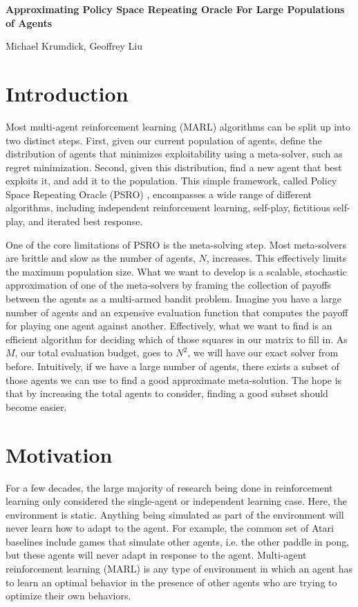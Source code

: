 \documentclass{article}
\begin{document}
\noindent \large\textbf{Approximating Policy Space Repeating Oracle For Large Populations of Agents}

\noindent \large Michael Krumdick, Geoffrey Liu

\section{Introduction}
Most multi-agent reinforcement learning (MARL) algorithms can be split up into two
distinct steps. First, given our current population of agents,
define the distribution of agents that minimizes exploitability using a
meta-solver, such as regret minimization. Second, given this distribution, find
a new agent that best exploits it, and add it to the population. This simple
framework, called Policy Space Repeating Oracle (PSRO) \cite{PSRO}, encompasses
a wide range of different algorithms, including independent reinforcement
learning, self-play, fictitious self-play, and iterated best response. 

One of the core limitations of PSRO is the meta-solving step. Most meta-solvers
are brittle and slow as the number of agents, $N$, increases. This effectively
limits the maximum population size. What we want to develop is a scalable,
stochastic approximation of one of the meta-solvers by framing the collection of
payoffs between the agents as a multi-armed bandit problem. Imagine you have a
large number of agents and an expensive evaluation function that computes the
payoff for playing one agent against another. Effectively, what we want to find
is an efficient algorithm for deciding which of those squares in our matrix to
fill in. As $M$, our total evaluation budget, goes to $N^2$, we will have our
exact solver from before. Intuitively, if we have a large number of agents,
there exists a subset of those agents we can use to find a good approximate
meta-solution. The hope is that by increasing the total agents to consider,
finding a good subset should become easier.

\section{Motivation}
For a few decades, the large majority of research being done in reinforcement
learning only considered the single-agent or independent learning case. Here, the environment is
static. Anything being simulated as part of the environment will never learn how
to adapt to the agent. For example, the common set of Atari baselines
\cite{atari} include games that simulate other agents, i.e. the other paddle in
pong, but these agents will never adapt in response to the agent. Multi-agent
reinforcement learning (MARL) is any type of environment in which an agent has to learn
an optimal behavior in the presence of other agents who are trying to optimize
their own behaviors. 
\end{document}

